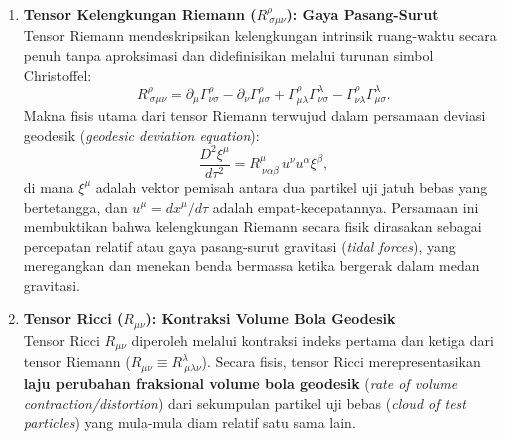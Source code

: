 \begin{enumerate}[label=(\alph*), wide=0pt, leftmargin=*]
    \item \textbf{Tensor Kelengkungan Riemann ($R^\rho_{\ \sigma\mu\nu}$): Gaya Pasang-Surut}\\
    Tensor Riemann mendeskripsikan kelengkungan intrinsik ruang-waktu secara penuh tanpa aproksimasi dan didefinisikan melalui turunan simbol Christoffel:
    \begin{equation}
        R^\rho_{\ \sigma\mu\nu} = \partial_\mu \Gamma^\rho_{\nu\sigma}
        - \partial_\nu \Gamma^\rho_{\mu\sigma}
        + \Gamma^\rho_{\mu\lambda}\Gamma^\lambda_{\nu\sigma}
        - \Gamma^\rho_{\nu\lambda}\Gamma^\lambda_{\mu\sigma}.
        \label{eq:riemann}
    \end{equation}
    Makna fisis utama dari tensor Riemann terwujud dalam persamaan deviasi geodesik (\textit{geodesic deviation equation}):
    \begin{equation}
        \frac{D^2 \xi^\mu}{d\tau^2} = R^\mu_{\ \nu\alpha\beta}\, u^\nu u^\alpha \xi^\beta,
        \label{eq:geodesic-deviation}
    \end{equation}
    di mana $\xi^\mu$ adalah vektor pemisah antara dua partikel uji jatuh bebas yang bertetangga, dan $u^\mu = dx^\mu/d\tau$ adalah empat-kecepatannya. Persamaan ini membuktikan bahwa kelengkungan Riemann secara fisik dirasakan sebagai percepatan relatif atau gaya pasang-surut gravitasi (\textit{tidal forces}), yang meregangkan dan menekan benda bermassa ketika bergerak dalam medan gravitasi.

    \item \textbf{Tensor Ricci ($R_{\mu\nu}$): Kontraksi Volume Bola Geodesik}\\
    Tensor Ricci $R_{\mu\nu}$ diperoleh melalui kontraksi indeks pertama dan ketiga dari tensor Riemann ($R_{\mu\nu} \equiv R^\lambda_{\ \mu\lambda\nu}$). Secara fisis, tensor Ricci merepresentasikan \textbf{laju perubahan fraksional volume bola geodesik} (\textit{rate of volume contraction/distortion}) dari sekumpulan partikel uji bebas (\textit{cloud of test particles}) yang mula-mula diam relatif satu sama lain.
    

\end{enumerate}
